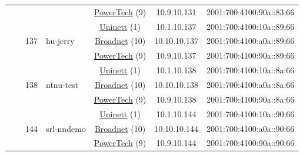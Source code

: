 \begin{small}
\begin{center}
\begin{longtable}{|c|c|c|c|c|c|c|c|}
  &  &  &  & \multicolumn{2}{|c|}{\tiny{\href{http://www.powertech.no}{PowerTech} (9)}} & \tiny{10.9.10.131} & \tiny{2001:700:4100:90a::83:66} \\* \cline{3-3}\cline{4-4}\cline{5-5}\cline{6-6}\cline{7-7}\cline{8-8}
  &  & \multirow{3}{*}{\tiny{137}} & \multicolumn{1}{|l|}{\multirow{3}{*}{\tiny{hu-jerry}}} & \multicolumn{2}{|c|}{\tiny{\href{https://www.uninett.no}{Uninett} (1)}} & \tiny{10.1.10.137} & \tiny{2001:700:4100:10a::89:66} \\* \cline{5-5}\cline{6-6}\cline{7-7}\cline{8-8}
  &  &  &  & \multicolumn{2}{|c|}{\tiny{\href{https://www.broadnet.no}{Broadnet} (10)}} & \tiny{10.10.10.137} & \tiny{2001:700:4100:a0a::89:66} \\* \cline{5-5}\cline{6-6}\cline{7-7}\cline{8-8}
  &  &  &  & \multicolumn{2}{|c|}{\tiny{\href{http://www.powertech.no}{PowerTech} (9)}} & \tiny{10.9.10.137} & \tiny{2001:700:4100:90a::89:66} \\* \cline{3-3}\cline{4-4}\cline{5-5}\cline{6-6}\cline{7-7}\cline{8-8}
  &  & \multirow{3}{*}{\tiny{138}} & \multicolumn{1}{|l|}{\multirow{3}{*}{\tiny{ntnu-test}}} & \multicolumn{2}{|c|}{\tiny{\href{https://www.uninett.no}{Uninett} (1)}} & \tiny{10.1.10.138} & \tiny{2001:700:4100:10a::8a:66} \\* \cline{5-5}\cline{6-6}\cline{7-7}\cline{8-8}
  &  &  &  & \multicolumn{2}{|c|}{\tiny{\href{https://www.broadnet.no}{Broadnet} (10)}} & \tiny{10.10.10.138} & \tiny{2001:700:4100:a0a::8a:66} \\* \cline{5-5}\cline{6-6}\cline{7-7}\cline{8-8}
  &  &  &  & \multicolumn{2}{|c|}{\tiny{\href{http://www.powertech.no}{PowerTech} (9)}} & \tiny{10.9.10.138} & \tiny{2001:700:4100:90a::8a:66} \\* \cline{3-3}\cline{4-4}\cline{5-5}\cline{6-6}\cline{7-7}\cline{8-8}
  &  & \multirow{3}{*}{\tiny{144}} & \multicolumn{1}{|l|}{\multirow{3}{*}{\tiny{srl-nndemo}}} & \multicolumn{2}{|c|}{\tiny{\href{https://www.uninett.no}{Uninett} (1)}} & \tiny{10.1.10.144} & \tiny{2001:700:4100:10a::90:66} \\* \cline{5-5}\cline{6-6}\cline{7-7}\cline{8-8}
  &  &  &  & \multicolumn{2}{|c|}{\tiny{\href{https://www.broadnet.no}{Broadnet} (10)}} & \tiny{10.10.10.144} & \tiny{2001:700:4100:a0a::90:66} \\* \cline{5-5}\cline{6-6}\cline{7-7}\cline{8-8}
  &  &  &  & \multicolumn{2}{|c|}{\tiny{\href{http://www.powertech.no}{PowerTech} (9)}} & \tiny{10.9.10.144} & \tiny{2001:700:4100:90a::90:66} \\* \cline{3-3}\cline{4-4}\cline{5-5}\cline{6-6}\cline{7-7}\cline{8-8}

\end{longtable}
\end{center}
\end{small}

